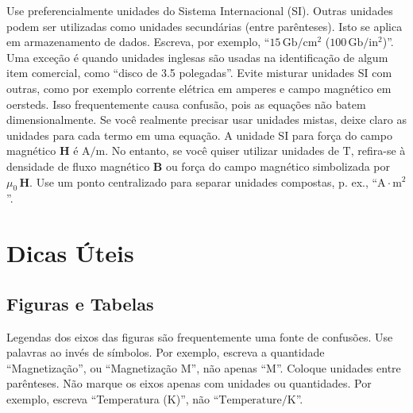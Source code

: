 \documentclass[a4paper]{ifacconf}
\begin{document}
Use preferencialmente unidades do Sistema Internacional (SI). Outras unidades
podem ser utilizadas como unidades secundárias (entre parênteses). Isto se aplica
em armazenamento de dados. Escreva,
por exemplo,  ``$15\,\mathrm{Gb}/\mathrm{cm}^2$ ($100\,\mathrm{Gb}/\mathrm{in}^2$)''. 
Uma exceção é quando unidades inglesas são usadas na identificação de algum item
comercial, como ``disco de 3.5 polegadas''. Evite misturar unidades SI com outras, 
como por exemplo corrente elétrica em amperes e campo magnético em oersteds. 
Isso frequentemente causa confusão, pois as equações não batem dimensionalmente. 
Se você realmente precisar usar unidades mistas, deixe claro as unidades para cada
termo em uma equação. A unidade SI para força do campo magnético 
$\mathbf{H}$ é $\mathrm{A}/\mathrm{m}$. No entanto, se você quiser utilizar unidades
de  $\mathrm{T}$, 
refira-se à densidade de fluxo magnético $\mathbf{B}$ ou
força do campo magnético simbolizada por $\mu_0\,\mathbf{H}$. 
Use um ponto centralizado para separar unidades compostas, p. ex.,  
``$\mathrm{A} \cdot \mathrm{m}^2$''.


\section{Dicas Úteis}

\subsection{Figuras e Tabelas}

Legendas dos eixos das figuras são frequentemente uma fonte de confusões. Use
palavras ao invés de símbolos. Por exemplo, escreva a quantidade ``Magnetização'',
ou ``Magnetização M'', não apenas ``M''. Coloque unidades entre parênteses. Não marque
os eixos apenas com unidades ou quantidades. Por exemplo, escreva 
``Temperatura ($\mathrm{K}$)'', não ``$\mbox{Temperature}/\mathrm{K}$''.
\end{document}
